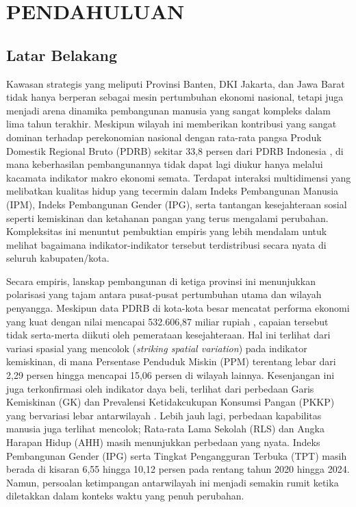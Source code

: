 \chapter{\normalsize PENDAHULUAN}
\raggedbottom
\section{\normalsize Latar Belakang}
Kawasan strategis yang meliputi Provinsi Banten, DKI Jakarta, dan Jawa Barat tidak hanya berperan sebagai mesin pertumbuhan ekonomi nasional, tetapi juga menjadi arena dinamika pembangunan manusia yang sangat kompleks dalam lima tahun terakhir. Meskipun wilayah ini memberikan kontribusi yang sangat dominan terhadap perekonomian nasional dengan rata-rata pangsa Produk Domestik Regional Bruto (PDRB) sekitar 33,8 persen dari PDRB Indonesia \citep{bpspdrb}, di mana keberhasilan pembangunannya tidak dapat lagi diukur hanya melalui kacamata indikator makro ekonomi semata. Terdapat interaksi multidimensi yang melibatkan kualitas hidup yang tecermin dalam Indeks Pembangunan Manusia (IPM), Indeks Pembangunan Gender (IPG), serta tantangan kesejahteraan sosial seperti kemiskinan dan ketahanan pangan yang terus mengalami perubahan. Kompleksitas ini menuntut pembuktian empiris yang lebih mendalam untuk melihat bagaimana indikator-indikator tersebut terdistribusi secara nyata di seluruh kabupaten/kota.

Secara empiris, lanskap pembangunan di ketiga provinsi ini menunjukkan polarisasi yang tajam antara pusat-pusat pertumbuhan utama dan wilayah penyangga. Meskipun data PDRB di kota-kota besar mencatat performa ekonomi yang kuat dengan nilai mencapai 532.606,87 miliar rupiah \citep{bpspdrb}, capaian tersebut tidak serta-merta diikuti oleh pemerataan kesejahteraan. Hal ini terlihat dari variasi spasial yang mencolok (\textit{striking spatial variation}) pada indikator kemiskinan, di mana Persentase Penduduk Miskin (PPM) terentang lebar dari 2,29 persen hingga mencapai 15,06 persen di wilayah lainnya. Kesenjangan ini juga terkonfirmasi oleh indikator daya beli, terlihat dari perbedaan Garis Kemiskinan (GK) dan Prevalensi Ketidakcukupan Konsumsi Pangan (PKKP) yang bervariasi lebar antarwilayah \citep{bpspkkp}. Lebih jauh lagi, perbedaan kapabilitas manusia juga terlihat mencolok; Rata-rata Lama Sekolah (RLS) dan Angka Harapan Hidup (AHH) masih menunjukkan perbedaan yang nyata. Indeks Pembangunan Gender (IPG) serta Tingkat Pengangguran Terbuka (TPT) masih berada di kisaran 6,55 hingga 10,12 persen pada rentang tahun 2020 hingga 2024. Namun, persoalan ketimpangan antarwilayah ini menjadi semakin rumit ketika diletakkan dalam konteks waktu yang penuh perubahan.

